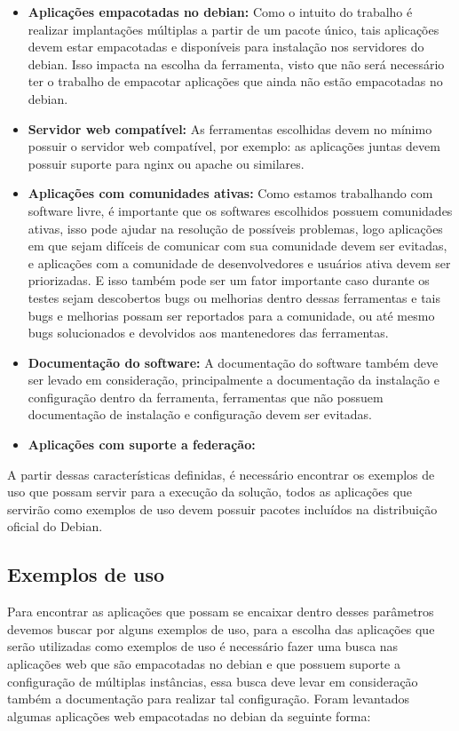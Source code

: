 \begin{itemize}
  \item  \textbf{Aplicações empacotadas no debian:} Como o intuito do trabalho
  é realizar implantações múltiplas a partir de um pacote único, tais aplicações
  devem estar empacotadas e disponíveis para instalação nos servidores do debian.
  Isso impacta na escolha da ferramenta, visto que não será necessário ter o trabalho
  de empacotar aplicações que ainda não estão empacotadas no debian.
  \item  \textbf{Servidor web compatível:} As ferramentas escolhidas devem no
  mínimo possuir o servidor web compatível, por exemplo: as aplicações juntas
  devem possuir suporte para nginx ou apache ou similares.
  \item  \textbf{Aplicações com comunidades ativas:} Como estamos trabalhando
  com software livre, é importante que os softwares escolhidos possuem comunidades
  ativas, isso pode ajudar na resolução de possíveis problemas, logo aplicações
  em que sejam difíceis de comunicar com sua comunidade devem ser evitadas, e
  aplicações com a comunidade de desenvolvedores e usuários ativa devem ser priorizadas.
  E isso também pode ser um fator importante caso durante os testes sejam descobertos
  bugs ou melhorias dentro dessas ferramentas e tais bugs e melhorias possam ser
  reportados para a comunidade, ou até mesmo bugs solucionados e devolvidos aos mantenedores
  das ferramentas.
  \item  \textbf{Documentação do software:} A documentação do software também deve
  ser levado em consideração, principalmente a documentação da instalação e configuração
  dentro da ferramenta, ferramentas que não possuem documentação de instalação e
  configuração devem ser evitadas.
  \item  \textbf{Aplicações com suporte a federação:} %
\end{itemize}

A partir dessas características definidas, é necessário encontrar os exemplos de uso
que possam servir para a execução da solução, todos as aplicações que servirão como
exemplos de uso devem possuir pacotes incluídos na distribuição oficial do Debian.

\subsection{Exemplos de uso}
\label{subsection:exemplos}

Para encontrar as aplicações que possam se encaixar dentro desses parâmetros
devemos buscar por alguns exemplos de uso, para a escolha das aplicações que
serão utilizadas como exemplos de uso é necessário fazer uma busca nas aplicações
web que são empacotadas no debian e que possuem suporte a configuração de múltiplas
instâncias, essa busca deve levar em consideração também a documentação para realizar
tal configuração. Foram levantados algumas aplicações web empacotadas no debian da
seguinte forma:

